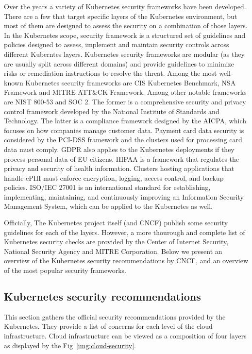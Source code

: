 Over the years a variety of Kubernetes security frameworks have been developed. There are a few that target specific layers of the Kubernetes environment, but most of them are designed to assess the security on a combination of those layers. In the Kubernetes scope, security framework is a structured set of guidelines and policies designed to assess, implement and maintain security controls across different Kuberntes layers. Kubernetes security frameworks are modular (as they are usually split across different domains) and provide guidelines to minimize risks or remediation instructions to resolve the threat. Among the most well-known Kubernetes security frameworks are CIS Kubernetes Benchmark, NSA Framework and MITRE ATT\&CK Framework. Among other notable frameworks are NIST 800-53 and SOC 2. The former is a comprehensive security and privacy control framework developed by the National Institute of Standards and Technology. The latter is a compliance framework designed by the AICPA, which focuses on how companies manage customer data. Payment card data security is considered by the PCI-DSS framework and the clusters used for processing card data must comply. GDPR also applies to the Kubernetes deployments if they process personal data of EU citizens. HIPAA is a framework that regulates the privacy and security of health information. Clusters hosting applications that handle ePHI must enforce encryption, logging, access control, and backup policies. ISO/IEC 27001 is an international standard for establishing, implementing, maintaining, and continuously improving an Information Security Management System, which can be applied to the Kubernetes as well.

Officially, The Kubernetes project itself (and CNCF) publish some security guidelines for each of the layers. However, a more thourough and complete list of Kubernetes security checks are provided by the Center of Internet Security, National Security Agency and MITRE Corporation. Below we present an overview of the Kubernetes security recommendations by CNCF, and an overview of the most popular security frameworks.

\subsection{Kubernetes security recommendations}

This section gathers the official security recommendations provided by the Kubernetes. They provide a list of concerns for each level of the cloud infrastructure. Cloud infrastructure can be viewed as a composition of four layers as displayed by the Fig~\ref{img:cloud-security}.

